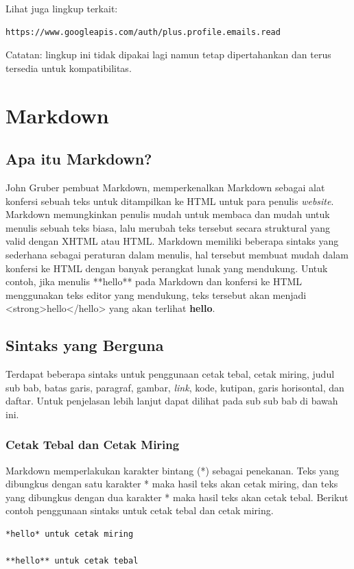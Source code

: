 Lihat juga lingkup terkait:
\begin{lstlisting}
https://www.googleapis.com/auth/plus.profile.emails.read
\end{lstlisting}
Catatan: lingkup ini tidak dipakai lagi namun tetap dipertahankan dan terus
tersedia untuk kompatibilitas.

\section{Markdown}
\label{sec:markdown}

\subsection{Apa itu Markdown? \cite{Markguide:2015}}
John Gruber pembuat Markdown, memperkenalkan Markdown sebagai alat konfersi
sebuah teks untuk ditampilkan ke HTML untuk para penulis {\it website}. Markdown
memungkinkan penulis mudah untuk membaca dan mudah untuk menulis sebuah teks
biasa, lalu merubah teks tersebut secara struktural yang valid dengan XHTML atau
HTML.
Markdown memiliki beberapa sintaks yang sederhana sebagai peraturan dalam
menulis, hal tersebut membuat mudah dalam konfersi ke HTML dengan banyak
perangkat lunak yang mendukung. Untuk contoh, jika menulis **hello** pada
Markdown dan konfersi ke HTML menggunakan teks editor yang mendukung, teks
tersebut akan menjadi <strong>hello</hello> yang akan terlihat \textbf{hello}.

\subsection{Sintaks yang Berguna \cite{Markguide:2015}}
Terdapat beberapa sintaks untuk penggunaan cetak tebal, cetak miring, judul sub
bab, batas garis, paragraf, gambar, {\it link}, kode, kutipan, garis
horisontal, dan daftar. Untuk penjelasan lebih lanjut dapat dilihat pada sub sub
bab di bawah ini.

\subsubsection{Cetak Tebal dan Cetak Miring}
Markdown memperlakukan karakter bintang (*) sebagai penekanan. Teks yang
dibungkus dengan satu karakter * maka hasil teks akan cetak miring, dan teks
yang dibungkus dengan dua karakter * maka hasil teks akan cetak tebal. Berikut
contoh penggunaan sintaks untuk cetak tebal dan cetak miring.

\begin{lstlisting}
*hello* untuk cetak miring

**hello** untuk cetak tebal
\end{lstlisting}

